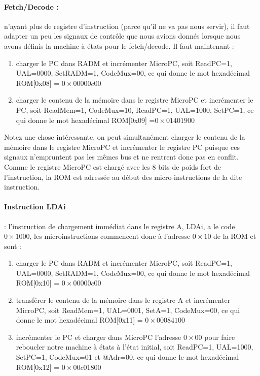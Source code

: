\paragraph{Fetch/Decode :} n'ayant plus de registre d'instruction (parce qu'il ne va pas nous servir), il faut adapter un peu les signaux de contrôle que nous avions donnés lorsque nous avons définis la machine à états pour le fetch/decode. Il faut maintenant :
\begin{enumerate}
\item charger le PC dans RADM et incrémenter MicroPC, soit ReadPC=1, UAL=0000, SetRADM=1, CodeMux=00, ce qui donne le mot hexadécimal ROM[0x08] = $0\times00000c00$
\item charger le contenu de la mémoire dans le registre MicroPC et incrémenter le PC, soit ReadMem=1, CodeMux=10, ReadPC=1, UAL=1000, SetPC=1, ce qui donne le mot hexadécimal ROM[0x09] =$0\times01401900$ 
\end{enumerate}
Notez une chose intéressante, on peut simultanément charger le contenu de la mémoire dans le registre MicroPC et incrémenter le registre PC puisque ces signaux n'empruntent pas les mêmes bus et ne rentrent donc pas en conflit. Comme le registre MicroPC est chargé avec les 8 bits de poids fort de l'instruction, la ROM est adressée au début des micro-instructions de la dite instruction.

\paragraph{Instruction LDAi} : l'instruction de chargement immédiat dans le registre A, LDAi, a le code $0\times1000$, les microinstructions commencent donc à l'adresse $0\times10$ de la ROM et sont :
\begin{enumerate}
\item charger le PC dans RADM et incrémenter MicroPC, soit ReadPC=1, UAL=0000, SetRADM=1, CodeMux=00, ce qui donne le mot hexadécimal ROM[0x10] = $0\times00000c00$
\item transférer le contenu de la mémoire dans le registre A et incrémenter MicroPC, soit ReadMem=1, UAL=0001, SetA=1, CodeMux=00, ce qui donne le mot hexadécimal ROM[0x11] = $0\times00084100$
\item incrémenter le PC et charger dans MicroPC l'adresse $0\times00$ pour faire reboucler notre machine à états à l'état initial, soit ReadPC=1, UAL=1000, SetPC=1, CodeMux=01 et @Adr=00, ce qui donne le mot hexadécimal ROM[0x12] = $0\times00c01800$
\end{enumerate}

